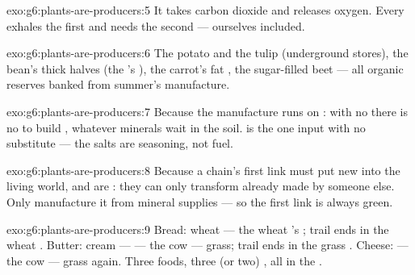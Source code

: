 \begin{solution}{exo:g6:plants-are-producers:5}
It takes carbon dioxide and releases oxygen. Every 
 exhales the first and needs the second ---
ourselves included.
\end{solution}

\begin{solution}{exo:g6:plants-are-producers:6}
The potato  and the tulip  (underground stores), the
bean's thick halves (the 's ), the carrot's fat
, the sugar-filled beet --- all organic reserves banked
from summer's manufacture.
\end{solution}

\begin{solution}{exo:g6:plants-are-producers:7}
Because the manufacture runs on : with no  there is
no  to build , whatever minerals wait in
the soil.  is the one input with no substitute --- the
salts are seasoning, not fuel.
\end{solution}

\begin{solution}{exo:g6:plants-are-producers:8}
Because a chain's first link must put new  into
the living world, and  are : they can only
transform  already made by someone else. Only
 manufacture it from mineral supplies --- so the
first link is always green.
\end{solution}

\begin{solution}{exo:g6:plants-are-producers:9}
Bread: wheat --- the wheat 's ; trail ends in the
wheat . Butter: cream ---  --- the cow --- grass;
trail ends in the grass . Cheese:  --- the cow ---
grass again. Three foods, three (or two) , all in the
.
\end{solution}

